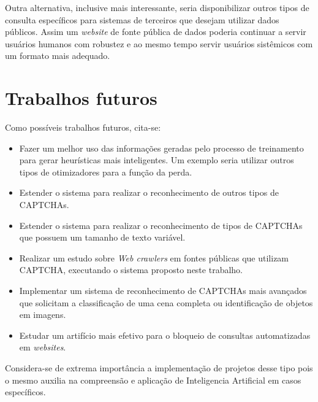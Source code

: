 Outra alternativa, inclusive mais interessante, seria
disponibilizar outros tipos de consulta específicos para sistemas de
terceiros que desejam utilizar dados públicos. Assim um
\textit{website} de fonte pública de dados poderia continuar a servir
usuários humanos com robustez e ao mesmo tempo servir usuários
sistêmicos com um formato mais adequado.

\section{Trabalhos futuros}

Como possíveis trabalhos futuros, cita-se: 

\begin{itemize}

        \item Fazer um melhor uso das informações geradas pelo
          processo de treinamento para gerar heurísticas mais
          inteligentes. Um exemplo seria utilizar outros tipos de
          otimizadores para a função da perda.

        \item Estender o sistema para realizar o reconhecimento de
          outros tipos de CAPTCHAs.

        \item Estender o sistema para realizar o reconhecimento de
          tipos de CAPTCHAs que possuem um tamanho de texto variável.

        \item Realizar um estudo sobre \textit{Web crawlers} em fontes
          públicas que utilizam CAPTCHA, executando o sistema proposto
          neste trabalho.

        \item Implementar um sistema de reconhecimento de CAPTCHAs
          mais avançados que solicitam a classificação de uma cena
          completa ou identificação de objetos em imagens.

        \item Estudar um artifício mais efetivo para o bloqueio de
          consultas automatizadas em \textit{websites}.

\end{itemize}

Considera-se de extrema importância a implementação de projetos desse
tipo pois o mesmo auxilia na compreensão e aplicação de Inteligencia 
Artificial em casos específicos.